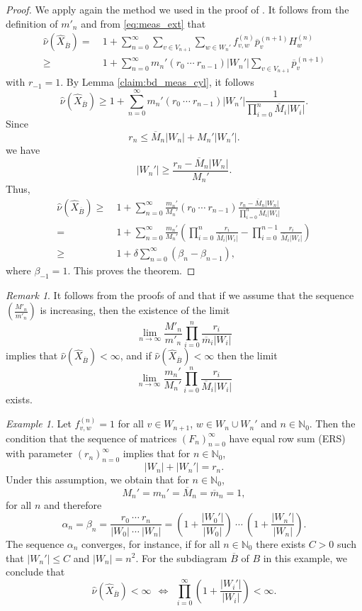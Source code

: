 \documentclass[11pt,reqno]{amsart}
\theoremstyle{definition}
\theoremstyle{remark}
\newtheorem{example}[definition]{Example}
\newtheorem{remark}[definition]{Remark}
\theoremstyle{plain}
\def\ol{\overline}
\def\ov{\overline}
\def\wh{\widehat}
\newcommand{\N}{\mathbb N}
\newcommand{\ba}{\begin{aligned}}
\newcommand{\ea}{\end{aligned}}
\numberwithin{equation}{section}
\begin{document}
\begin{proof}
We apply again the method we used in the proof of . It follows from the definition of $m'_n$ and from \eqref{eq:meas_ext} that 
\begin{align*}
    \wh \nu(\wh X_{\ov B}) = &\ 
1 + \sum_{n = 0}^{\infty} \sum_{v \in V_{n+1}}\sum_{w \in W_n'}f_{v,w}^{(n)}\ov p_v^{(n+1)}H_w^{(n)}\\
\geq &\ 1 + \sum_{n = 0}^{\infty} m_n'(r_0 \ \cdots \ r_{n-1})|W_n'|\sum_{v \in V_{n+1}}\ov p_v^{(n+1)}
\end{align*} 
with $r_{-1} =1$. By Lemma \ref{claim:bd_meas_cyl}, it follows
\[
\wh \nu(\wh X_{\ov B}) \geq 1 + \sum_{n = 0}^{\infty} m_n'(r_0 \ \cdots\ r_{n-1})|W_n'|\frac{1}{\prod_{i = 0}^n\ov M_i |W_i|}.
\]
Since 
$$
r_n \leq \ov M_n |W_n| + M_n' |W_n'|.
$$
we have 
$$
|W_n'| \geq \frac{r_n - \ov M_n |W_n|}{M_n'}.
$$
Thus, 
$$
\ba
\wh \nu(\wh X_{\ov B}) \geq &\ 1 + \sum_{n = 0}^{\infty} \frac{m_n'}{M_n'}(r_0\ \cdots \ r_{n-1})\frac{r_n - \ov M_n |W_n|}{\prod_{i = 0}^n\ov M_i |W_i|}\\
= &\ 1 + \sum_{n = 0}^{\infty} \frac{m_n'}{M_n'} \left( \prod_{i = 0}^n \frac{r_i}{\ov M_i |W_i|}  - \prod_{i = 0}^{n-1} \frac{r_i}{\ov M_i |W_i|} \right)\\ 
\geq  &\ 1 + \delta \sum_{n = 0}^{\infty} (\beta_{n} - \beta_{n-1}),
\ea
$$ 
where $\beta_{-1} =1$. This proves the theorem. 
\end{proof}

\begin{remark}
It follows from the proofs of  and  that if we assume that the sequence $\left(\frac{M'_n}{m'_n}\right)$ is 
increasing, then the existence of the limit 
$$
\lim_{n\to \infty}\frac{M'_n}{m'_n} \prod_{i = 0}^n \frac{r_i}
{\ov m_i |W_i|}
$$
implies that $\wh \nu(\wh X_{\ov B}) < \infty$, and if 
$\wh \nu(\wh X_{\ov B}) < \infty$ then the limit 
$$
\lim_{n\to \infty} 
\frac{m_n'}{M_n'}  \prod_{i = 0}^n \frac{r_i}{\ov M_i |W_i|}
$$
exists.

\end{remark}

\begin{example}\label{example1}
Let $f_{v,w}^{(n)} = 1$ for all $v \in W_{n+1}$,  $w \in W_n \cup W_{n}'$ and $n \in \mathbb{N}_0$. Then the condition that the sequence of matrices $(F_n)_{n=0}^{\infty}$ have equal row sum (ERS) with parameter $(r_n)_{n=0}^{\infty}$ implies that for $n \in \N_0$,
$$
|W_n| + |W_n'| = r_n.
$$
Under this assumption, we obtain that for $n \in \N_0$,
    $$
    M_n' = m_n' = \ov M_n = \ov m_n = 1,   
    $$
    for all $n$ and therefore 
    $$
    \alpha_n = \beta_n = 
    \frac{r_0\ \cdots \ r_n}{|W_0|\ \cdots\ |W_n|} = \left(1 + \frac{|W_0'|}{|W_0|}\right)\ \cdots\ \left(1 + \frac{|W_n'|}{|W_n|}\right).
    $$
The sequence $\alpha_n$ converges, for instance, if for all $n \in \N_0$ there exists $C > 0$ such that $|W_n'| \leq C$ and $|W_n| = n^2$. For the subdiagram $\ol B$ of $B$ in this example, we conclude that 
$$
\wh\nu(\wh X_{\ol B}) < \infty \ \ \Longleftrightarrow \ \ 
\prod_{i=0}^\infty \left(1 + \frac{|W_i'|}{|W_i|}\right) < \infty.
$$
\end{example}
\end{document}
